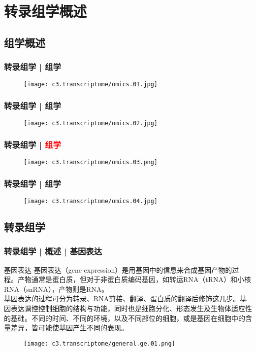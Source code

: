 \section{转录组学概述}
\subsection{组学概述}
\begin{frame}
  \frametitle{转录组学 | 组学}
  \begin{figure}
    \centering
    \texttt{[image: c3.transcriptome/omics.01.jpg]}
  \end{figure}
\end{frame}

\begin{frame}
  \frametitle{转录组学 | 组学}
  \begin{figure}
    \centering
    \texttt{[image: c3.transcriptome/omics.02.jpg]}
  \end{figure}
\end{frame}

\begin{frame}
  \frametitle{转录组学 | \textcolor{red}{组学}}
  \begin{figure}
    \centering
    \texttt{[image: c3.transcriptome/omics.03.png]}
  \end{figure}
\end{frame}

\begin{frame}
  \frametitle{转录组学 | 组学}
  \begin{figure}
    \centering
    \texttt{[image: c3.transcriptome/omics.04.jpg]}
  \end{figure}
\end{frame}

\subsection{转录组学}
\begin{frame}
  \frametitle{转录组学 | 概述 | 基因表达}
  \begin{block}{基因表达}
 基因表达（gene expression）是用基因中的信息来合成基因产物的过程。产物通常是蛋白质，但对于非蛋白质编码基因，如转运RNA（tRNA）和小核RNA（snRNA），产物则是RNA。\\
 \vspace{0.5em}
基因表达的过程可分为转录、RNA剪接、翻译、蛋白质的翻译后修饰这几步。基因表达调控控制细胞的结构与功能，同时也是细胞分化、形态发生及生物体适应性的基础。不同的时间、不同的环境，以及不同部位的细胞，或是基因在细胞中的含量差异，皆可能使基因产生不同的表现。
  \end{block}
  \begin{figure}
    \centering
    \texttt{[image: c3.transcriptome/general.ge.01.png]}
  \end{figure}
\end{frame}

